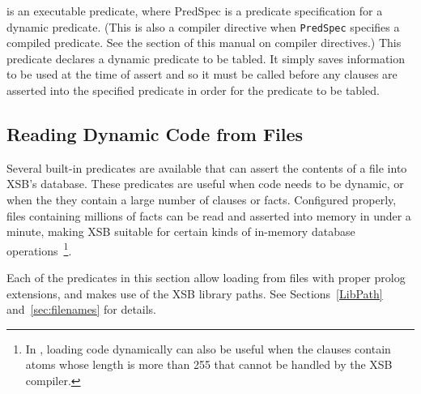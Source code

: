 \begin{description}
is an executable predicate, where PredSpec is a predicate
specification for a dynamic predicate. (This is also a compiler
directive when {\tt PredSpec} specifies a compiled predicate. See the
section of this manual on compiler directives.) This predicate
declares a dynamic predicate to be tabled. It simply saves information
to be used at the time of assert and so it must be called before any
clauses are asserted into the specified predicate in order for the
predicate to be tabled.

\end{description}

\subsection{Reading Dynamic Code from Files} \label{sec:LoadDyn}

Several built-in predicates are available that can assert the contents
of a file into XSB's database.  These predicates are useful when code
needs to be dynamic, or when the they contain a large number of
clauses or facts.  Configured properly, files containing millions of
facts can be read and asserted into memory in under a minute, making
XSB suitable for certain kinds of in-memory database
operations~\footnote{In \version{}, loading code dynamically can also
be useful when the clauses contain atoms whose length is more than 255
that cannot be handled by the XSB compiler.}.  

Each of the predicates in this section allow loading from files with
proper prolog extensions, and makes use of the XSB library paths.  See
Sections~\ref{LibPath} and~\ref{sec:filenames} for details.

